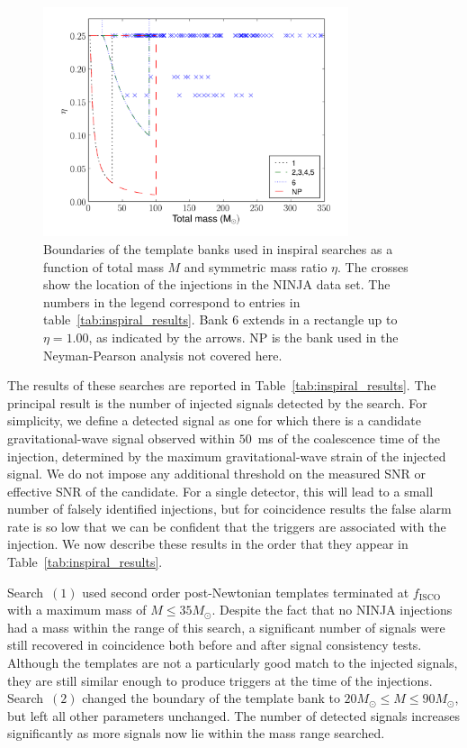 \begin{figure}
  \begin{center}
  \includegraphics[width=0.8\textwidth]{figures/ninja1/ninja_banks}
  \end{center}
  \caption[Boundaries of template banks in NINJA1 inspiral searches]{
\label{f:ninjaBanks}
Boundaries of the template banks used in inspiral searches as a
function of total mass $M$ and symmetric mass ratio $\eta$. The crosses show
the location of the injections in the NINJA data set. The numbers in the
legend correspond to entries in table~\ref{tab:inspiral_results}. Bank 6
extends in a rectangle up to $\eta = 1.00$, as indicated by the arrows. NP
is the bank used in the Neyman-Pearson analysis not covered here.}
\end{figure}

The results of these searches are reported in
Table~\ref{tab:inspiral_results}.  The principal result is the number
of injected signals detected by the search.  For simplicity, we define
a detected signal as one for which there is a candidate
gravitational-wave signal observed within $50$~ms of the coalescence
time of the injection, determined by the maximum gravitational-wave
strain of the injected signal.  We do not impose any additional
threshold on the measured SNR or effective SNR of the candidate.  For
a single detector, this will lead to a small number of falsely
identified injections, but for coincidence results the false alarm
rate is so low that we can be confident that the triggers are
associated with the injection. We now describe these results in the
order that they appear in Table~\ref{tab:inspiral_results}.

Search~$(1)$ used second order post-Newtonian templates terminated at
$f_\mathrm{ISCO}$ with a maximum mass of $M \le 35 M_{\odot}$.
Despite the fact that no NINJA injections had a mass within the range
of this search, a significant number of signals were still recovered
in coincidence both before and after signal consistency tests.
Although the templates are not a particularly good match to the
injected signals, they are still similar enough to produce triggers at
the time of the injections.  Search~$(2)$ changed the boundary of the
template bank to $20 M_\odot \le M \le 90 M_{\odot}$, but left all
other parameters unchanged.  The number of detected signals increases
significantly as more signals now lie within the mass range searched. 

